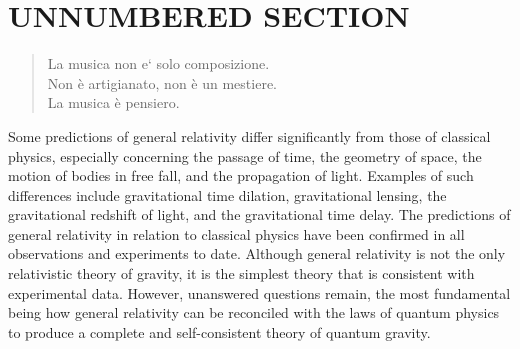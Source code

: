\newpage %
\section*{UNNUMBERED SECTION}

\begin{quote}
La musica non e` solo composizione. \\
Non è artigianato, non è un mestiere. \\
La musica è pensiero. \cite{nono85}
\end{quote}

Some predictions of general relativity differ significantly from those of
classical physics, especially concerning the passage of time, the geometry of
space, the motion of bodies in free fall, and the propagation of light. Examples
of such differences include gravitational time dilation, gravitational lensing,
the gravitational redshift of light, and the gravitational time delay. The
predictions of general relativity in relation to classical physics have been
confirmed in all observations and experiments to date. Although general
relativity is not the only relativistic theory of gravity, it is the simplest
theory that is consistent with experimental data. However, unanswered questions
remain, the most fundamental being how general relativity can be reconciled with
the laws of quantum physics to produce a complete and self-consistent theory of
quantum gravity.


